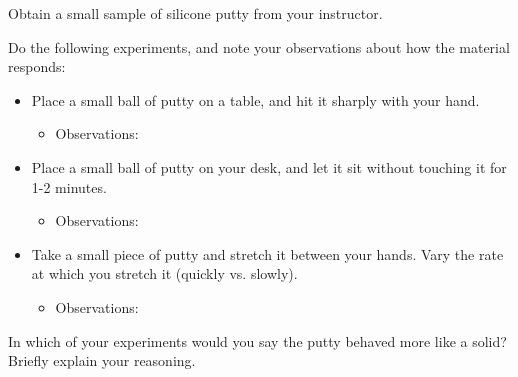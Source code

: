 \begin{activity}
\begin{instructornotes}
\end{instructornotes}


\begin{model}
\label{model:sillyputty}

	Obtain a small sample of silicone putty from your instructor.
	
	Do the following experiments, and note your observations about how the material responds:
	
	\begin{itemize}
		\item Place a small ball of putty on a table, and hit it sharply with your hand.
			\begin{itemize}
				\item Observations:
				
				\vspace{1in}
			\end{itemize}
		
		\item Place a small ball of putty on your desk, and let it sit without touching it for 1-2 minutes.
			\begin{itemize}
				\item Observations:
				
				\vspace{1in}
			\end{itemize}
		
		\item Take a small piece of putty and stretch it between your hands.  Vary the rate at which you stretch it (quickly vs. slowly).
			\begin{itemize}
				\item Observations:
				
				\vspace{1.25in}
			\end{itemize}
		
	\end{itemize}

\end{model}


\begin{ctqs}

	\question In which of your experiments would you say the putty behaved more like a solid?  Briefly explain your reasoning.
	
		\begin{solution}[1in]
		\end{solution}
	

\end{ctqs}
\end{activity}
